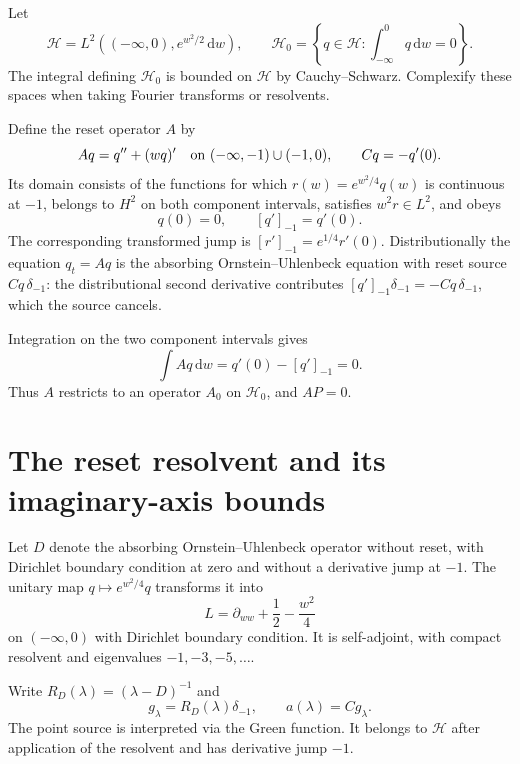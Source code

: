 \documentclass[11pt,a4paper]{article}
\numberwithin{equation}{section}
\theoremstyle{remark}\newtheorem{remark}[theorem]{Remark}
\newcommand{\HH}{\mathcal H}\newcommand{\DD}{\mathcal D}
\newcommand{\dd}{\,\mathrm d}
\begin{document}
Let
\[
 \HH=L^2(( -\infty,0),e^{w^2/2}\dd w),\qquad
 \HH_0=\left\{q\in\HH:\int_{-\infty}^0q\dd w=0\right\}.
\]
The integral defining $\HH_0$ is bounded on $\HH$ by Cauchy--Schwarz. Complexify these spaces when taking Fourier transforms or resolvents.

Define the reset operator $A$ by
\begin{equation}\label{eq:Adef}
 Aq=q''+(wq)' \quad\hbox{on }(-\infty,-1)\cup(-1,0),
 \qquad Cq=-q'(0).
\end{equation}
Its domain consists of the functions for which $r(w)=e^{w^2/4}q(w)$ is continuous at $-1$, belongs to $H^2$ on both component intervals, satisfies $w^2r\in L^2$, and obeys
\begin{equation}\label{eq:Adomain}
 q(0)=0,\qquad [q']_{-1}=q'(0).
\end{equation}
The corresponding transformed jump is $[r']_{-1}=e^{1/4}r'(0)$. Distributionally the equation $q_t=Aq$ is the absorbing Ornstein--Uhlenbeck equation with reset source $Cq\,\delta_{-1}$: the distributional second derivative contributes $[q']_{-1}\delta_{-1}=-Cq\,\delta_{-1}$, which the source cancels.

Integration on the two component intervals gives
\begin{equation}\label{eq:massA}
 \int Aq\dd w=q'(0)-[q']_{-1}=0.
\end{equation}
Thus $A$ restricts to an operator $A_0$ on $\HH_0$, and $AP=0$.

\section{The reset resolvent and its imaginary-axis bounds}
Let $D$ denote the absorbing Ornstein--Uhlenbeck operator without reset, with Dirichlet boundary condition at zero and without a derivative jump at $-1$. The unitary map $q\mapsto e^{w^2/4}q$ transforms it into
\[
 L=\partial_{ww}+\frac12-\frac{w^2}{4}
\]
on $(-\infty,0)$ with Dirichlet boundary condition. It is self-adjoint, with compact resolvent and eigenvalues $-1,-3,-5,\ldots$.

Write $R_D(\lambda)=(\lambda-D)^{-1}$ and
\[
 g_\lambda=R_D(\lambda)\delta_{-1},\qquad
 a(\lambda)=Cg_\lambda.
\]
The point source is interpreted via the Green function. It belongs to $\HH$ after application of the resolvent and has derivative jump $-1$.
\end{document}
